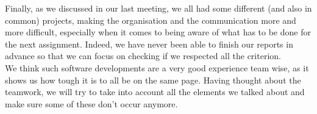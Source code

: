 \documentclass[a4paper, 12pt]{article}
\begin{document}
Finally, as we discussed in our last meeting, we all had some different (and also in common) projects, making the organisation and the communication more and more difficult, especially when it comes to being aware of what has to be done for the next assignment. Indeed, we have never been able to finish our reports in advance so that we can focus on checking if we respected all the criterion. \\

We think such software developments are a very good experience team wise, as it shows us how tough it is to all be on the same page. Having thought about the teamwork, we will try to take into account all the elements we talked about and make sure some of these don't occur anymore.
\end{document}
